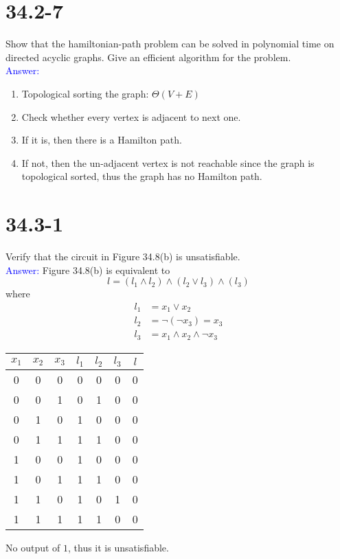 \documentclass[a4paper]{article}
\begin{document}
\section{34.2-7}
Show that the hamiltonian-path problem can be solved in polynomial time on directed acyclic graphs. Give an efficient algorithm for the problem.\\
\textcolor{blue}{Answer:}
    \begin{enumerate}
        \item Topological sorting the graph: $\Theta(V+E)$
        \item Check whether every vertex is adjacent to next one.
        \item If it is, then there is a Hamilton path.
        \item If not, then the un-adjacent vertex is not reachable since the graph is topological sorted, thus the graph has no Hamilton path.
    \end{enumerate}
\section{34.3-1}
Verify that the circuit in Figure 34.8(b) is unsatisfiable.\\
\textcolor{blue}{Answer:} Figure 34.8(b) is equivalent to
    \begin{equation*}
        l=(l_1\land l_2) \land (l_2\lor l_3) \land (l_3)
    \end{equation*}
    where
    \begin{align*}
        l_1 &= x_1\lor x_2\\
        l_2 &= \lnot(\lnot x_3)=x_3\\
        l_3 &= x_1\land x_2\land \lnot x_3
    \end{align*}
    \begin{center}
        \begin{tabular}{ccc|ccc|c}
             $x_1$ & $x_2$ & $x_3$ & $l_1$ & $l_2$ & $l_3$ & $l$\\
             \hline
             0 & 0 & 0 & 0 & 0 & 0 & 0\\
             0 & 0 & 1 & 0 & 1 & 0 & 0\\
             0 & 1 & 0 & 1 & 0 & 0 & 0\\
             0 & 1 & 1 & 1 & 1 & 0 & 0\\
             1 & 0 & 0 & 1 & 0 & 0 & 0\\
             1 & 0 & 1 & 1 & 1 & 0 & 0\\
             1 & 1 & 0 & 1 & 0 & 1 & 0\\
             1 & 1 & 1 & 1 & 1 & 0 & 0
        \end{tabular}
    \end{center}
    No output of $1$, thus it is unsatisfiable.
\end{document}
